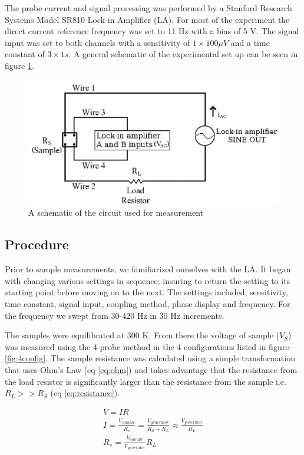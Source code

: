 \documentclass[
reprint,
amsmath,amssymb,
aps,
tikz,
border=5pt
]{revtex4-1}
\begin{document}
    The probe current and signal processing was performed by a Stanford Research Systems Model SR810 Lock-in Amplifier (LA). For most of the experiment the direct current reference frequency was set to 11 Hz with a bias of 5 V. The signal input was set to both channels  with a sensitivity of $1\times 100 \mu V$ and a time constant of $3\times 1 s$. A general schematic of the experimental set up can be seen in figure \ref{fig:schematic}.

    \begin{figure}[b]
      \includegraphics[width = 0.45 \textwidth]{figures/schematic.png} 
      \caption{A schematic of the circuit used for measurement}
      \label{fig:schematic}
    \end{figure}

\subsection*{Procedure}

    Prior to sample measurements, we familiarized ourselves with the LA. It began with changing various settings in sequence; insuring to return the setting to its starting point before moving on to the next. The settings included, sensitivity, time constant, signal input, coupling method, phase display and frequency. For the frequency we swept from 30-420 Hz in 30 Hz increments. 

    The samples were equilibrated at 300 K. From there the voltage of sample ($V_S$) was measured using the 4-probe method in the 4 configurations listed in figure \ref{fig:4config}. The sample resistance was calculated using a simple transformation that uses Ohm's Law (eq \ref{eq:ohm}) and takes advantage that the resistance from the load resistor  is significantly larger than the resistance from the sample i.e. $R_L >> R_S$ (eq \ref{eq:resistance}). 

    \begin{gather}
      V = IR \label{eq:ohm} \\
      I = \frac{V_{sample}}{R_s} = \frac{V_{generator}}{R_S + R_L} \approx \frac{V_{generator}}{R_L} \label{eq:approx}\\
      R_s = \frac{V_{sample}}{V_{generator}}R_L \label{eq:resistance}
    \end{gather}
\end{document}
